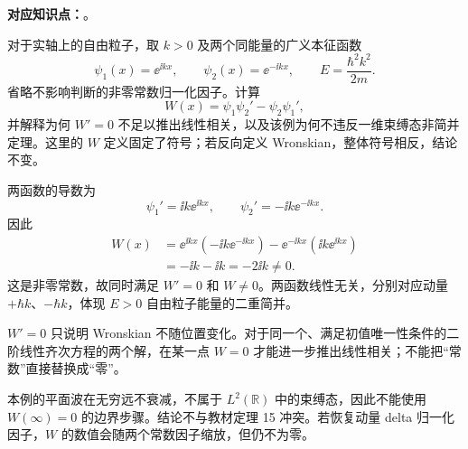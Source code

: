 
\textbf{对应知识点：}。

对于实轴上的自由粒子，取 $k>0$ 及两个同能量的广义本征函数
\begin{equation}
  \psi_1(x)=\ee^{\ii kx},\qquad
  \psi_2(x)=\ee^{-\ii kx},\qquad
  E=\frac{\hbar^2k^2}{2m}.
\end{equation}
省略不影响判断的非零常数归一化因子。计算
\begin{equation}
  W(x)=\psi_1\psi_2'-\psi_2\psi_1',
\end{equation}
并解释为何 $W'=0$ 不足以推出线性相关，以及该例为何不违反一维束缚态非简并定理。这里的 $W$ 定义固定了符号；若反向定义 Wronskian，整体符号相反，结论不变。

\begin{checkedsolution}
两函数的导数为
\begin{equation}
  \psi_1'=\ii k\ee^{\ii kx},\qquad
  \psi_2'=-\ii k\ee^{-\ii kx}.
\end{equation}
因此
\begin{align}
  W(x)
  &=\ee^{\ii kx}(-\ii k\ee^{-\ii kx})
    -\ee^{-\ii kx}(\ii k\ee^{\ii kx})\\
  &=-\ii k-\ii k=\boxed{-2\ii k\ne0}.
\end{align}
这是非零常数，故同时满足 $W'=0$ 和 $W\ne0$。两函数线性无关，分别对应动量 $+\hbar k$、$-\hbar k$，体现 $E>0$ 自由粒子能量的二重简并。

$W'=0$ 只说明 Wronskian 不随位置变化。对于同一个、满足初值唯一性条件的二阶线性齐次方程的两个解，在某一点 $W=0$ 才能进一步推出线性相关；不能把“常数”直接替换成“零”。

本例的平面波在无穷远不衰减，不属于 $L^2(\mathbb R)$ 中的束缚态，因此不能使用 $W(\infty)=0$ 的边界步骤。结论不与教材定理 15 冲突。若恢复动量 delta 归一化因子，$W$ 的数值会随两个常数因子缩放，但仍不为零。
\end{checkedsolution}
